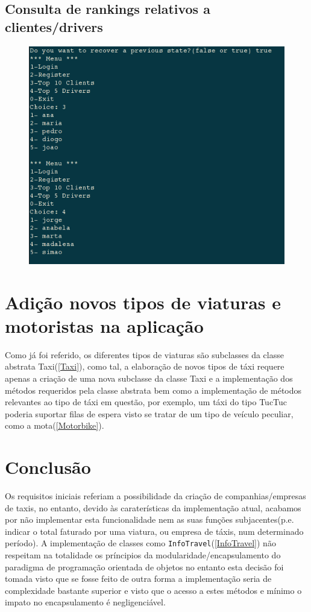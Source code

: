 \documentclass[a4paper,10pt,portuguese]{article}
\begin{document}
\subsection{Consulta de rankings relativos a clientes/drivers}
\begin{figure}[H]
    \centering
    \includegraphics[width=120mm]{top5top10.png}
\end{figure}


\section{Adição novos tipos de viaturas e motoristas na aplicação}
Como já foi referido, os diferentes tipos de viaturas são subclasses da classe abstrata Taxi(\ref{Taxi}), como tal, a elaboração de novos tipos de táxi requere apenas a criação de uma nova subclasse da classe Taxi e a implementação dos métodos requeridos pela classe abstrata bem como a implementação de métodos relevantes ao tipo de táxi em questão, por exemplo, um táxi do tipo TucTuc poderia suportar filas de espera visto se tratar de um tipo de veículo peculiar, como a mota(\ref{Motorbike}).

\newpage

\section{Conclusão}
Os requisitos iniciais referiam a possibilidade da criação de companhias/empresas de taxis, no entanto, devido às caraterísticas da implementação atual, acabamos por não implementar esta funcionalidade nem as suas funções subjacentes(p.e. indicar o total faturado por uma viatura, ou empresa de táxis, num determinado período). A implementação de classes como \texttt{InfoTravel}(\ref{InfoTravel}) não respeitam na totalidade os príncipios da modularidade/encapsulamento do paradigma de programação orientada de objetos no entanto esta decisão foi tomada visto que se fosse feito de outra forma a implementação seria de complexidade bastante superior e visto que o acesso a estes métodos e mínimo o impato no encapsulamento é negligenciável.
\end{document}
